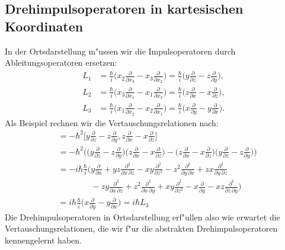 \subsection{Drehimpulsoperatoren in kartesischen Koordinaten}
In der Ortsdarstellung m"ussen wir die Impulsoperatoren durch
Ableitungsoperatoren ersetzen:
\begin{align*}
L_1
&=
\frac{\hbar}{i}\biggl(
x_2\frac{\partial}{\partial x_3}
-
x_3\frac{\partial}{\partial x_2}
\biggr)
=
\frac{\hbar}{i}\biggl(
y\frac{\partial}{\partial z}
-
z\frac{\partial}{\partial y}
\biggr),
\\
L_2
&=
\frac{\hbar}{i}
\biggl(
x_3\frac{\partial}{\partial x_1}
-
x_1\frac{\partial}{\partial x_3}
\biggr)
=
\frac{\hbar}{i}
\biggl(
z\frac{\partial}{\partial x}
-
x\frac{\partial}{\partial z}
\biggr),
\\
L_3
&=
\frac{\hbar}{i}
\biggl(
x_1\frac{\partial}{\partial x_2}
-
x_2\frac{\partial}{\partial x_1}
\biggr)
=
\frac{\hbar}{i}
\biggl(
x\frac{\partial}{\partial y}
-
y\frac{\partial}{\partial x}
\biggr).
\end{align*}
Als Beispiel rechnen wir die Vertauschungsrelationen nach:
\begin{align*}
[L_1,L_2]
&=
-\hbar^2\biggl[
y\frac{\partial}{\partial z}
-
z\frac{\partial}{\partial y},
z\frac{\partial}{\partial x}
-
x\frac{\partial}{\partial z}
\biggr]
\\
&=
-\hbar^2\biggl(
\biggl(
y\frac{\partial}{\partial z}
-
z\frac{\partial}{\partial y}
\biggr)
\biggl(
z\frac{\partial}{\partial x}
-
x\frac{\partial}{\partial z}
\biggr)
-
\biggl(
z\frac{\partial}{\partial x}
-
x\frac{\partial}{\partial z}
\biggr)
\biggl(
y\frac{\partial}{\partial z}
-
z\frac{\partial}{\partial y}
\biggr)
\biggr)
\\
&=
-i\hbar\frac{\hbar}{i}\biggl(
y\frac{\partial}{\partial x}+yz\frac{\partial^2}{\partial x\,\partial z}
-xy\frac{\partial^2}{\partial z^2}
-z^2\frac{\partial^2}{\partial y\,\partial x}
+zx\frac{\partial^2}{\partial y\,\partial z}
\\
&\qquad\qquad
-
zy\frac{\partial^2}{\partial x\,\partial z}
+z^2\frac{\partial^2}{\partial x\,\partial y}
+xy\frac{\partial^2}{\partial z^2}
-x\frac{\partial}{\partial y}-xz\frac{\partial^2}{\partial z\,\partial y}
\biggr)
\\
&=
i\hbar\frac{\hbar}{i}\biggl(
x\frac{\partial}{\partial y}-y\frac{\partial}{\partial x}
\biggr)
=i\hbar L_3
\end{align*}
Die Drehimpulsoperatoren in Ortsdarstellung erf"ullen also wie erwartet
die Vertauschungsrelationen, die wir f"ur die abstrakten Drehimpulsoperatoren
kennengelernt haben.

